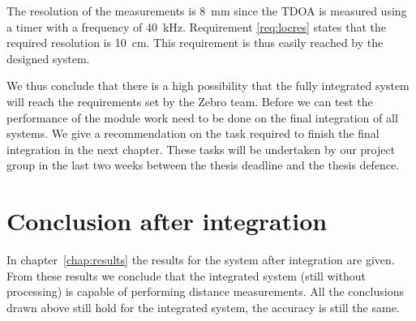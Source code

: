 The resolution of the measurements is \SI{8}{\milli\meter} since the TDOA is measured using a timer with a frequency of \SI{40}{\kilo\hertz}.
Requirement \ref{req:locres} states that the required resolution is \SI{10}{\centi\meter}.
This requirement is thus easily reached by the designed system.

We thus conclude that there is a high possibility that the fully integrated system will reach the requirements set by the Zebro team.
Before we can test the performance of the module work need to be done on the final integration of all systems.
We give a recommendation on the task required to finish the final integration in the next chapter.
These tasks will be undertaken by our project group in the last two weeks between the thesis deadline and the thesis defence.

\section{Conclusion after integration}

In chapter~\ref{chap:results} the results for the system after integration are given.
From these results we conclude that the integrated system (still without processing) is capable of performing distance measurements.
All the conclusions drawn above still hold for the integrated system, the accuracy is still the same.
